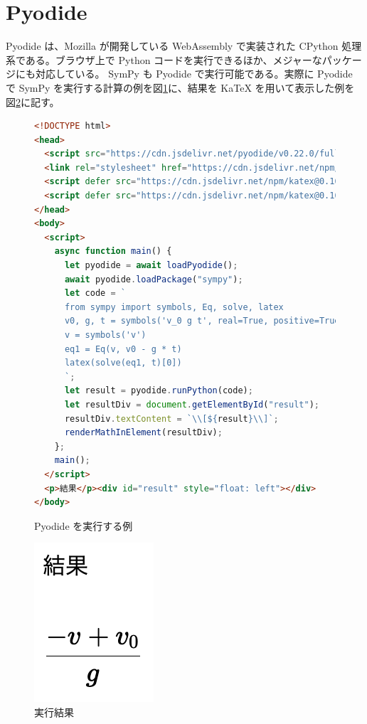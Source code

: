 \section{Pyodide}
Pyodide は、Mozilla が開発している WebAssembly で実装された CPython 処理系である。ブラウザ上で Python コードを実行できるほか、メジャーなパッケージにも対応している。 SymPy も Pyodide で実行可能である。実際に Pyodide で SymPy を実行する計算の例を図\ref{Pyodide_example}に、結果を KaTeX を用いて表示した例を図\ref{Pyodide_result}に記す。

\begin{figure}[htb]
\begin{lstlisting}[language=html]
<!DOCTYPE html>
<head>
  <script src="https://cdn.jsdelivr.net/pyodide/v0.22.0/full/pyodide.js"></script>
  <link rel="stylesheet" href="https://cdn.jsdelivr.net/npm/katex@0.16.4/dist/katex.min.css" integrity="sha384-vKruj+a13U8yHIkAyGgK1J3ArTLzrFGBbBc0tDp4ad/EyewESeXE/Iv67Aj8gKZ0" crossorigin="anonymous">
  <script defer src="https://cdn.jsdelivr.net/npm/katex@0.16.4/dist/katex.min.js" integrity="sha384-PwRUT/YqbnEjkZO0zZxNqcxACrXe+j766U2amXcgMg5457rve2Y7I6ZJSm2A0mS4" crossorigin="anonymous"></script>
  <script defer src="https://cdn.jsdelivr.net/npm/katex@0.16.4/dist/contrib/auto-render.min.js" integrity="sha384-+VBxd3r6XgURycqtZ117nYw44OOcIax56Z4dCRWbxyPt0Koah1uHoK0o4+/RRE05" crossorigin="anonymous" onload="renderMathInElement(document.body);"></script>
</head>
<body>
  <script>
    async function main() {
      let pyodide = await loadPyodide();
      await pyodide.loadPackage("sympy");
      let code = `
      from sympy import symbols, Eq, solve, latex
      v0, g, t = symbols('v_0 g t', real=True, positive=True)
      v = symbols('v')
      eq1 = Eq(v, v0 - g * t)
      latex(solve(eq1, t)[0])
      `;
      let result = pyodide.runPython(code);
      let resultDiv = document.getElementById("result");
      resultDiv.textContent = `\\[${result}\\]`;
      renderMathInElement(resultDiv);
    };
    main();
  </script>
  <p>結果</p><div id="result" style="float: left"></div>
</body>
\end{lstlisting}
\caption{Pyodide を実行する例} \label{Pyodide_example}
\end{figure}
\restoregeometry

\begin{figure}[htb]
\centering
\includegraphics{work/pyodide_screenshot.png}
\caption{実行結果} \label{Pyodide_result}
\end{figure}
